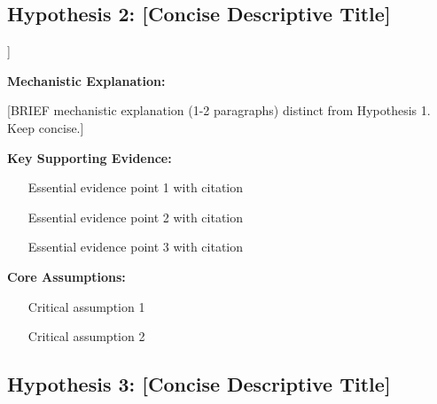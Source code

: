 \documentclass[11pt,letterpaper]{article}
\begin{document}
\subsection*{Hypothesis 2: [Concise Descriptive Title]}

\begin{hypothesisbox2}[Hypothesis 2: [Title]]

\textbf{Mechanistic Explanation:}

[BRIEF mechanistic explanation (1-2 paragraphs) distinct from Hypothesis 1. Keep concise.]

\vspace{0.2cm}

\textbf{Key Supporting Evidence:}
\begin{itemize}
  \item [Essential evidence point 1 with citation]
  \item [Essential evidence point 2 with citation]
  \item [Essential evidence point 3 with citation]
\end{itemize}

\vspace{0.2cm}

\textbf{Core Assumptions:}
\begin{enumerate}
  \item [Critical assumption 1]
  \item [Critical assumption 2]
\end{enumerate}

\end{hypothesisbox2}

\vspace{0.3cm}

\subsection*{Hypothesis 3: [Concise Descriptive Title]}
\end{document}
